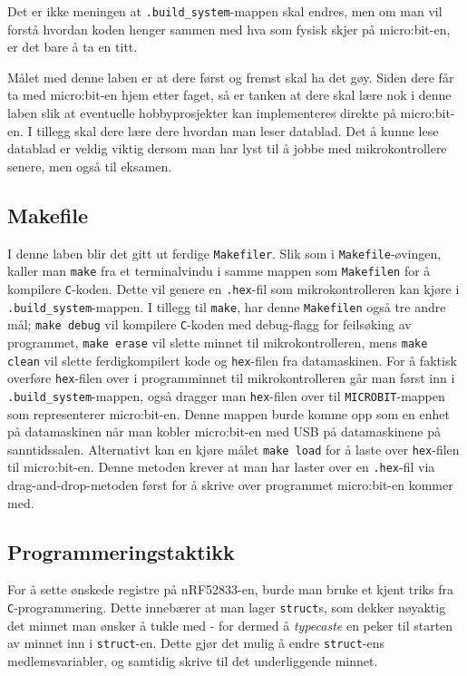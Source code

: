 \begin{alphasection}
Det er ikke meningen at \verb|.build_system|-mappen skal endres, men om man vil forstå hvordan koden henger sammen med hva som fysisk skjer på micro:bit-en, er det bare å ta en titt.

Målet med denne laben er at dere først og fremst skal ha det gøy. Siden dere får ta med micro:bit-en hjem etter faget, så er tanken at dere skal lære nok i denne laben slik at eventuelle hobbyprosjekter kan implementeres direkte på micro:bit-en. I tillegg skal dere lære dere hvordan man leser datablad. Det å kunne lese datablad er veldig viktig dersom man har lyst til å jobbe med mikrokontrollere senere, men også til eksamen.


\subsection{Makefile}

I denne laben blir det gitt ut ferdige \verb|Makefiler|. Slik som i \verb|Makefile|-øvingen, kaller man \verb|make| fra et terminalvindu i samme mappen som \verb|Makefilen| for å kompilere \verb|C|-koden. Dette vil genere en \verb|.hex|-fil som mikrokontrolleren kan kjøre i \verb|.build_system|-mappen. I tillegg til \verb|make|, har denne \verb|Makefilen| også tre andre mål; \verb|make debug| vil kompilere \verb|C|-koden med debug-flagg for feilsøking av programmet, \verb|make erase| vil slette minnet til mikrokontrolleren, mens \verb|make clean| vil slette ferdigkompilert kode og \verb|hex|-filen fra datamaskinen. For å faktisk overføre \verb|hex|-filen over i programminnet til mikrokontrolleren går man først inn i \verb|.build_system|-mappen, også dragger man \verb|hex|-filen over til \verb|MICROBIT|-mappen som representerer micro:bit-en. Denne mappen burde komme opp som en enhet på datamaskinen når man kobler micro:bit-en med USB på datamaskinene på sanntidssalen. Alternativt kan en kjøre målet \verb|make load| for å laste over \verb|hex|-filen til micro:bit-en. Denne metoden krever at man har laster over en \verb|.hex|-fil via drag-and-drop-metoden først for å skrive over programmet micro:bit-en kommer med.

\subsection{Programmeringstaktikk}

For å sette ønskede registre på nRF52833-en, burde man bruke et kjent triks fra \verb|C|-programmering. Dette innebærer at man lager \verb|struct|s, som dekker nøyaktig det minnet man ønsker å tukle med - for dermed å \textit{typecaste} en peker til starten av minnet inn i \verb|struct|-en. Dette gjør det mulig å endre \verb|struct|-ens medlemsvariabler, og samtidig skrive til det underliggende minnet.


\end{alphasection}
